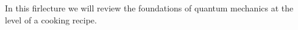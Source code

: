 In this firlecture we will review the foundations of quantum mechanics at the level of a cooking recipe. 